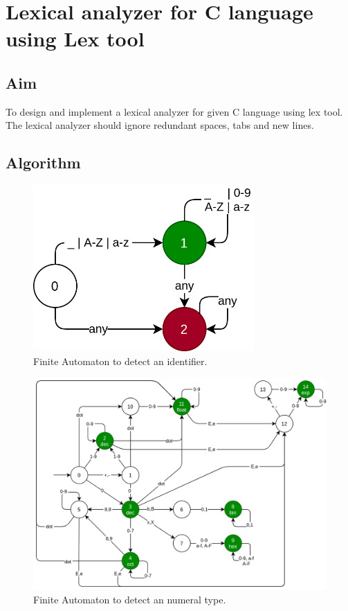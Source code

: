 \clearpage
\chapter{Lexical analyzer for C language using Lex tool}

\section{Aim}
To design and implement a lexical analyzer for given C language using lex tool. The lexical analyzer should ignore redundant spaces, tabs and new lines.

\section{Algorithm}

\begin{figure}[H]
	\centering
	\includegraphics[height=2.5in]{../EXP1/identifier.png}
	\caption{Finite Automaton to detect an identifier.}
\end{figure}

\begin{figure}[H]
	\centering
	\includegraphics[width=\textwidth]{../EXP1/numerals.png}
	\caption{Finite Automaton to detect an numeral type.}
\end{figure}


